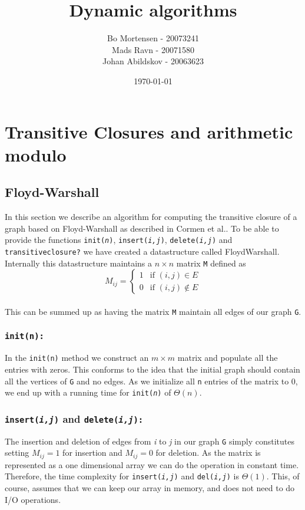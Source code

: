 \documentclass[a4paper,oneside,article]{memoir}
\begin{document}
\title{Dynamic algorithms}
\author{
       Bo Mortensen - 20073241\\
       Mads Ravn - 20071580\\
       Johan Abildskov - 20063623
}
\date{\today}

\maketitle
\chapter{Transitive Closures and arithmetic modulo}
\section{Floyd-Warshall}
In this section we describe an algorithm for computing the transitive
closure of a graph based on Floyd-Warshall as described in Cormen et
al.\cite{IntAlg}.  To be able to provide the functions
\texttt{init(\textit{n})}, \texttt{insert(\textit{i,j})},
\texttt{delete(\textit{i,j})} and \texttt{transitiveclosure?} we have
created a datastructure called FloydWarshall. \\ Internally this
datastructure maintains a $n \times n$ matrix \texttt{M} defined as
$$M_{ij} =
\begin{cases}
  1 & \text{if } (i,j) \in E \\
  0 & \text{if } (i,j) \notin E 
\end{cases}
$$\\
This can be summed up as having the matrix \texttt{M} maintain all edges of our graph \texttt{G}.
\subsection{\texttt{init(n):}}
In the \texttt{init(n)} method we construct an $m \times m$ matrix and
populate all the entries with zeros. This conforms to the idea that
the initial graph should contain all the vertices of \texttt{G} and no
edges. As we initialize all \texttt{n} entries of the matrix to 0, we
end up with a running time for \texttt{init(\textit{n})} of
$\Theta(\textit{n})$.
\subsection{\texttt{insert(\textit{i,j})} and \texttt{delete(\textit{i,j}):}}
The insertion and deletion of edges from \textit{i} to \textit{j}
in our graph \texttt{G} simply constitutes setting $M_{ij} = 1$ for
insertion and $M_{ij} = 0$ for deletion.  As the matrix is represented
as a one dimensional array we can do the operation in constant time.
Therefore, the time complexity for \texttt{insert(\textit{i,j})} and
\texttt{del(\textit{i,j})} is $\Theta(1)$. This, of course, assumes that
we can keep our array in memory, and does not need to do I/O
operations.
\end{document}
